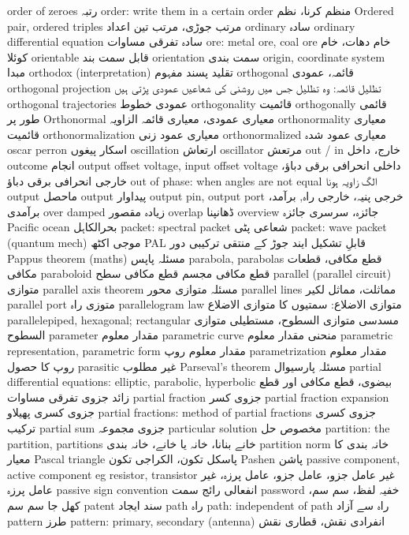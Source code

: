order of zeroes	رتبہ
order: write them in a certain order	منظم کرنا، نظم
Ordered pair, ordered triples	مرتب جوڑی، مرتب تین اعداد
ordinary	سادہ
ordinary differential equation	سادہ تفرقی مساوات
ore: metal ore, coal ore	خام دھات، خام کوئلا
orientable	قابل سمت بند
orientation	سمت بندی
origin, coordinate system	مبدا
orthodox (interpretation)	تقلید پسند مفہوم
orthogonal	قائمہ، عمودی
orthogonal projection	تظلیل قائمہ: وہ تظلیل جس میں روشنی کی شعاعیں عمودی پڑتی ہیں
orthogonal trajectories	عمودی  خطوط
orthogonality	قائمیت
orthogonally	قائمی طور پر
Orthonormal	معیاری عمودی، معیاری قائمہ الزاویہ
orthonormality	معیاری قائمیت
orthonormalization	معیاری عمود زنی
orthonormalized	معیاری عمود شدہ
oscar perron	اسکار پیغوں
oscillation	ارتعاش
oscillator	مرتعش
out / in	خارج، داخل
outcome	انجام
output offset voltage, input offset voltage	داخلی انحرافی برقی دباؤ، خارجی انحرافی برقی دباؤ
out of phase: when angles are not equal	الگ زاویہ ہونا
output	ماحصل
output	پیداوار
output pin, output port	خرجی پنیہ، خارجی راہ, برآمد، برآمدی
over damped	زیادہ مقصور
overlap	ڈھانپنا
overview	 جائزہ، سرسری جائزہ
Pacific ocean	بحرالکاہل
packet: spectral packet	شعاعی پٹی
packet: wave packet (quantum mech)	موجی اکٹھ
PAL	قابلِ تشکیل ایند جوڑ کے منتقی ترکیبی دور
Pappus theorem (maths)	مسئلہ پاپس
parabola, parabolas	قطع مکافی، قطعات مکافی
paraboloid	قطع مکافی مجسم  قطع مکافی سطح
parallel (parallel circuit)	متوازی
parallel axis theorem	مسئلہ متوازی محور
parallel lines	مماثلت، مماثل لکیر
parallel port	متوزی راہ
parallelogram law	متوازی الاضلاع: سمتیوں کا متوازی الاضلاع
parallelepiped, hexagonal; rectangular	مسدسی متوازی السطوح، مستطیلی متوازی السطوح
parameter	مقدار معلوم
parametric curve	منحنی مقدار معلوم
parametric representation, parametric form	مقدار معلوم روپ
parametrization	مقدار معلوم روپ کا حصول
parasitic	غیر مطلوب
Parseval's theorem	مسئلہ پارسیوال
partial differential equations: elliptic, parabolic, hyperbolic	بیضوی، قطع مکافی اور قطع زائد جزوی تفرقی مساوات
partial fraction	جزوی کسر
partial fraction expansion	جزوی کسری پھیلاو
partial fractions: method of partial fractions	جزوی کسری ترکیب
partial sum	جزوی مجموعہ
particular solution	مخصوص حل
partition: the partition, partitions	خانے بنانا، خانہ یا خانے، خانہ بندی
partition norm	خانہ بندی کا معیار
Pascal triangle	پاسکل تکون،  الکراجی تکون
Pashen	پاشن
passive component, active component eg resistor, transistor	غیر عامل جزو، عامل جزو، عامل پرزہ، غیر عامل پرزہ
passive sign convention	انفعالی رائج سمت
password	خفیہ لفظ، سم سم،  کھل جا سم سم
patent	سند ایجاد
path	راہ
path: independent of path	راہ سے آزاد
pattern	طرز
pattern: primary, secondary (antenna)	انفرادی نقش، قطاری نقش
